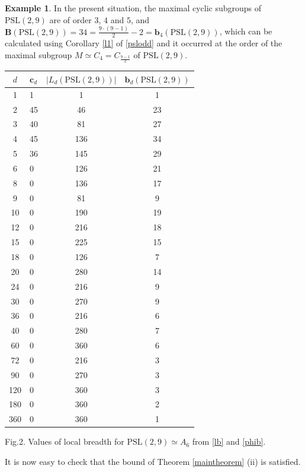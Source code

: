 \documentclass{amsart}
\theoremstyle{definition}
\newtheorem{example}[theorem]{Example}
\numberwithin{equation}{section}
\begin{document}
\begin{example}
In the present situation,  the maximal cyclic subgroups of $\mathrm{PSL}(2,9)$ are of order $3$, $4$ and $5$,  and $\mathbf{B}(\mathrm{PSL}(2,9))=34=\frac{ 9 \cdot (9-1)}{2}-2=\mathbf{b}_{4}(\mathrm{PSL}(2,9))$, which can be calculated using Corollary \ref{l1} of \eqref{pslodd}  and it occurred at the order of the maximal subgroup $M\simeq C_4=C_{\frac{9-1}{2}}$ of $\mathrm{PSL}(2,9)$. 
\begin{center}
\begin{tabular}{|c|l|c|c|}
            \hline
        $d$ & $\mathbf{c}_d$  & $|L_d(\mathrm{PSL}(2,9))|$ & $\mathbf{b}_d(\mathrm{PSL}(2,9))$ \\
    \hline 
    1  &   1    & 1    &  1 \\  
    2  & 45     & 46   &  23 \\
    3  & 40     & 81   &  27 \\
    4  & 45     & 136  &  34 \\
    5  & 36     & 145  &  29 \\
    6  & 0    & 126  &  21 \\
    8 & 0     & 136  &  17 \\
    9 & 0     & 81  &  9 \\
    10 & 0    & 190  & 19 \\
    12 & 0    & 216  & 18 \\
    15  & 0       & 225  &  15 \\
    18  & 0       & 126  &  7 \\
    20 & 0       &  280 & 14  \\
    24 & 0       &  216 &  9 \\
    30 & 0       &  270 &  9 \\
    36  & 0       &  216 & 6 \\
    40 & 0       & 280  &  7 \\
    60 & 0       & 360 &  6 \\ 
    72 & 0       & 216  & 3 \\ 
    90 & 0       & 270  &  3 \\
    120 & 0       & 360 &  3 \\
    180 & 0       & 360  & 2 \\
    360 & 0       & 360  & 1 \\
   \hline
    \end{tabular}
\end{center}
\medskip
\centerline{Fig.2. Values of local breadth for $\mathrm{PSL}
(2,9) \simeq A_6$ from \eqref{lb} and \eqref{phib}.}

\medskip

It is now easy to check that the bound of Theorem \ref{maintheorem} (ii) is satisfied.
\end{example}
\end{document}
